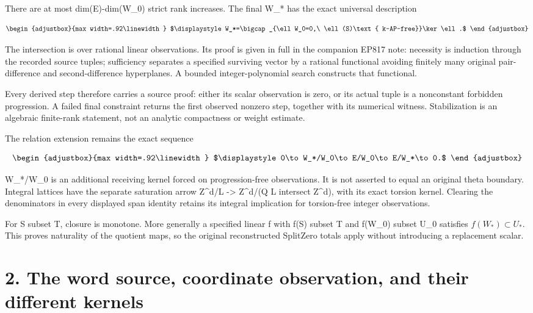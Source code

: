 There are at most dim(E)-dim(W\_0) strict rank increases. The final W\_* has the exact universal description

\[
\begin{adjustbox}{max width=.92\linewidth}
$\displaystyle W_*=\bigcap_{\ell W_0=0,\ \ell(S)\text{ k-AP-free}}\ker\ell.$
\end{adjustbox}
\]

The intersection is over rational linear observations. Its proof is given in full in the companion EP817 note: necessity is induction through the recorded source tuples; sufficiency separates a specified surviving vector by a rational functional avoiding finitely many original pair-difference and second-difference hyperplanes. A bounded integer-polynomial search constructs that functional.

Every derived step therefore carries a source proof: either its scalar observation is zero, or its actual tuple is a nonconstant forbidden progression. A failed final constraint returns the first observed nonzero step, together with its numerical witness. Stabilization is an algebraic finite-rank statement, not an analytic compactness or weight estimate.

The relation extension remains the exact sequence

\[
\begin{adjustbox}{max width=.92\linewidth}
$\displaystyle 0\to W_*/W_0\to E/W_0\to E/W_*\to0.$
\end{adjustbox}
\]

W\_*/W\_0 is an additional receiving kernel forced on progression-free observations. It is not asserted to equal an original theta boundary. Integral lattices have the separate saturation arrow Z\^{}d/L -\textgreater{} Z\^{}d/(Q L intersect Z\^{}d), with its exact torsion kernel. Clearing the denominators in every displayed span identity retains its integral implication for torsion-free integer observations.

For S subset T, closure is monotone. More generally a specified linear f with f(S) subset T and f(W\_0) subset U\_0 satisfies \(f(W_*)\subset U_*\). This proves naturality of the quotient maps, so the original reconstructed SplitZero totals apply without introducing a replacement scalar.

\section{2. The word source, coordinate observation, and their different kernels}\label{n17-the-word-source-coordinate-observation-and-their-different-kernels}

